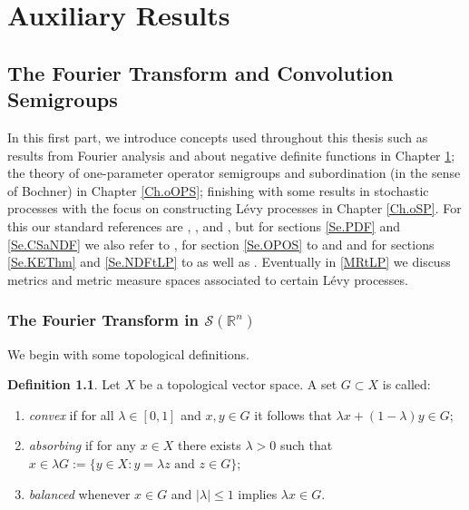 \documentclass[a4paper, 12pt]{report}
\theoremstyle{cor}
\theoremstyle{remark}
\theoremstyle{definition}
\newtheorem{defn}[theorem]{Definition}
\begin{document}
\newpage\null

\part{Auxiliary Results}

\newpage\null

\chapter{The Fourier Transform and Convolution Semigroups}\label{Ch.oTFTaCS}

In this first part, we introduce concepts used throughout this thesis such as results from Fourier analysis and about negative definite functions in Chapter \ref{Ch.oTFTaCS}; the theory of one-parameter operator semigroups and subordination (in the sense of Bochner) in Chapter \ref{Ch.oOPS}; finishing with some results in stochastic processes with the focus on constructing L\'evy processes in Chapter \ref{Ch.oSP}.  For this our standard references are \cite{Vol1}, \cite{Vol2}, \cite{Vol3} and \cite{Bernstein}, but for sections \ref{Se.PDF} and \ref{Se.CSaNDF} we also refer to \cite{I.25}, for section \ref{Se.OPOS} to \cite{I.235} and \cite{Tanabe} and for sections \ref{Se.KEThm} and \ref{Se.NDFtLP} to \cite{SPRef} as well as \cite{Sato}.  Eventually in \ref{MRtLP} we discuss metrics and metric measure spaces associated to certain L\'evy processes.

\section{The Fourier Transform in $\mathcal{S}(\mathbb{R}^n)$}\label{TFTiSS}

We begin with some topological definitions.

\begin{defn}
Let $X$ be a topological vector space.  A set $G \subset X$ is called:
\begin{enumerate}
\item \emph{convex} if for all $\lambda \in [0, 1]$ and $x, y \in G$ it follows that $\lambda x + (1 - \lambda)y \in G$;

\item \emph{absorbing} if for any $x \in X$ there exists $\lambda > 0$ such that $x \in \lambda G := \{y \in X : y = \lambda z \text{ and } z \in G\}$;

\item \emph{balanced} whenever $x \in G$ and $|\lambda| \le 1$ implies $\lambda x \in G$.
\end{enumerate}
\end{defn}
\end{document}
